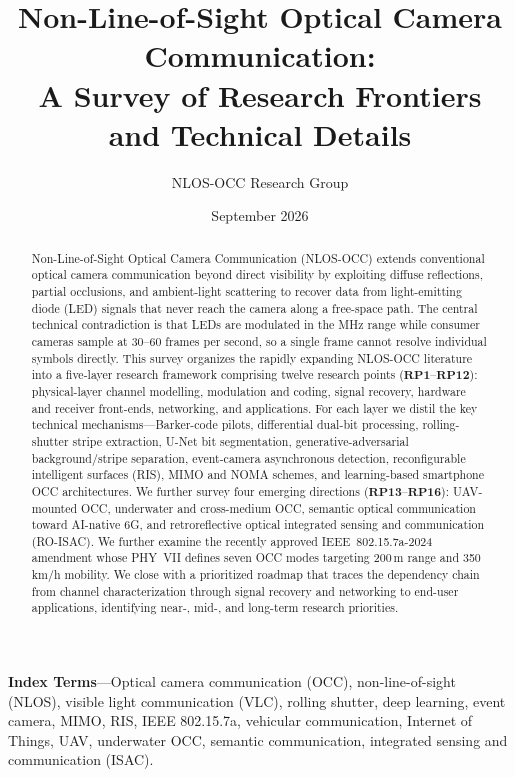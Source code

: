 \documentclass[10pt,a4paper]{article}
\title{Non-Line-of-Sight Optical Camera Communication: \\
       A Survey of Research Frontiers and Technical Details}
\author{
  NLOS-OCC Research Group
}
\date{September 2026}
\newcommand{\rp}[1]{\textbf{RP#1}}
\begin{document}
\maketitle

\begin{abstract}
Non-Line-of-Sight Optical Camera Communication (NLOS-OCC) extends
conventional optical camera communication beyond direct visibility by
exploiting diffuse reflections, partial occlusions, and ambient-light
scattering to recover data from light-emitting diode (LED) signals that
never reach the camera along a free-space path. The central technical
contradiction is that LEDs are modulated in the MHz range while consumer
cameras sample at 30--60 frames per second, so a single frame cannot
resolve individual symbols directly. This survey organizes the rapidly
expanding NLOS-OCC literature into a five-layer research framework
comprising twelve research points ($\rp{1}$--$\rp{12}$): physical-layer
channel modelling, modulation and coding, signal recovery, hardware and
receiver front-ends, networking, and applications. For each layer we
distil the key technical mechanisms---Barker-code pilots, differential
dual-bit processing, rolling-shutter stripe extraction, U-Net bit
segmentation, generative-adversarial background/stripe separation,
event-camera asynchronous detection, reconfigurable intelligent surfaces
(RIS), MIMO and NOMA schemes, and learning-based smartphone OCC
architectures. We further survey four emerging directions
($\rp{13}$--$\rp{16}$): UAV-mounted OCC, underwater and cross-medium
OCC, semantic optical communication toward AI-native 6G, and
retroreflective optical integrated sensing and communication (RO-ISAC).
We further examine the recently approved IEEE~802.15.7a-2024 amendment
whose PHY~VII defines seven OCC modes targeting 200\,m range and
350\,km/h mobility. We close with a prioritized roadmap that traces the
dependency chain from channel characterization through signal recovery
and networking to end-user applications, identifying near-, mid-, and
long-term research priorities.
\end{abstract}

\noindent\textbf{Index Terms}---Optical camera communication (OCC),
non-line-of-sight (NLOS), visible light communication (VLC), rolling
shutter, deep learning, event camera, MIMO, RIS, IEEE 802.15.7a,
vehicular communication, Internet of Things, UAV, underwater OCC,
semantic communication, integrated sensing and communication (ISAC).
\end{document}
